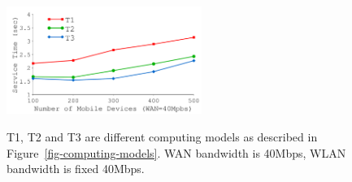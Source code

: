 {
\begin{figure}[th]
\begin{center}
	\centerline{\includegraphics[width=2.5in]{Figures/g_plot_simulation-wan.pdf}}
	{
		T1, T2 and T3 are different computing models as described in
		Figure~\ref{fig-computing-models}. WAN bandwidth is 40Mbps,
		WLAN bandwidth is fixed 40Mbps.
	}
\end{center}
\end{figure}
}
